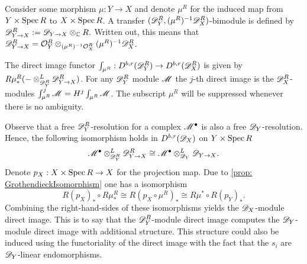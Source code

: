     Consider some morphism $\mu:Y\to X$ and denote $\mu^R$ for the induced map from $Y\times \operatorname{Spec} R$ to $X\times \operatorname{Spec} R$.
    A transfer $(\mathscr{D}_Y^R,(\mu^R)^{-1}\mathscr{D}_X^R)$-bimodule is defined by $\mathscr{D}_{Y\to X}^R:= \mathscr{D}_{Y\to X}\otimes_{\mathbb{C}} R .$ Written out, this means that $\mathscr{D}_{Y\to X}^R = \mathcal{O}_Y^R \otimes_{(\mu^R)^{-1}\mathcal{O}_X^R}(\mu^R)^{-1}\mathscr{D}_X^R$.
    \begin{definition}
      The direct image functor $\int_{\mu^R}:D^{b,r}(\mathscr{D}_Y^R)\to D^{b,r}(\mathscr{D}_X^R)$ is given by $R\mu^R_* ({-}\otimes_{\mathscr{D}_Y^R}^L \mathscr{D}_{Y\to X}^R)$.
      For any $\mathscr{D}_Y^R$ module $\mathscr{M}$ the $j$-th direct image is the $\mathscr{D}_X^R$-modules $\int^j_{\mu^R} \mathscr{M} = H^j \int_{\mu^R} \mathscr{M}$.
      The subscript $\mu^R$ will be suppressed whenever there is no ambiguity.
    \end{definition}
    Observe that a free $\mathscr{D}_Y^R$-resolution for a complex $\mathscr{M}^\bullet$ is also a free $\mathscr{D}_Y$-resolution.
    Hence, the following isomorphism holds in $D^{b,r}(\mathscr{D}_X)$ on $Y\times \operatorname{Spec} R$
    $$\mathscr{M}^\bullet \otimes_{\mathscr{D}_Y^R}^L \mathscr{D}_{Y\to X}^R \cong \mathscr{M}^\bullet \otimes_{\mathscr{D}_Y}^L \mathscr{D}_{Y\to X}.$$
    Denote $p_X:X\times \operatorname{Spec} R \to X$ for the projection map.
    Due to \cref{prop: GrothendieckIsomorphism} one has a isomorphism
    $$R(p_X)_* \circ R\mu^R_* \cong R(p_X \circ \mu^R)_* \cong R\mu^* \circ R(p_Y)_*.$$
    Combining the right-hand-sides of these isomorphisms yields the $\mathscr{D}_X$-module direct image.
    This is to say that the $\mathscr{D}_Y^R$-module direct image computes the $\mathscr{D}_Y$-module direct image with additional structure.
    This structure could also be induced using the functoriality of the direct image with the fact that the $s_i$ are $\mathscr{D}_Y$-linear endomorphisms.


